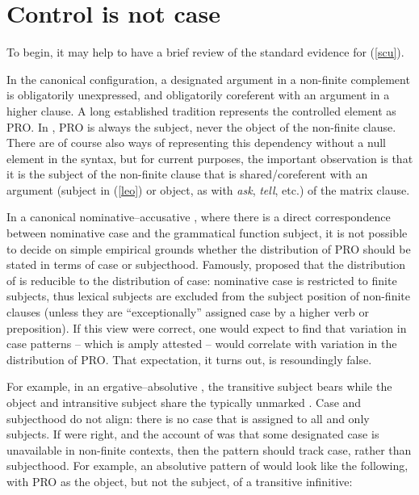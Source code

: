 \documentclass[output=paper]{langsci/langscibook}
\begin{document}
\section{Control is not case}

To begin, it may help to have a brief review of the standard evidence for
(\ref{scu}).

In the canonical  configuration, a designated argument in a non-finite
complement is obligatorily unexpressed, and obligatorily coreferent with an
argument in a higher clause. A long established tradition represents the
controlled element as PRO. In , PRO is always the subject, never the
object of the non-finite clause. There are of course also ways of representing
this dependency without a null element in the syntax, but for current purposes,
the important observation is that it is the subject of the non-finite clause
that is shared/coreferent with an argument (subject in (\ref{leo}) or object,
as with \emph{ask}, \emph{tell}, etc.) of the matrix clause.

\ea \label{leo}	\begin{xlista}
	\end{xlista}
\z

In a canonical nominative--accusative , where there is a direct
correspondence between nominative case and the grammatical function subject, it
is not possible to decide on simple empirical grounds whether the distribution
of PRO should be stated in terms of case or subjecthood. Famously,
\cite{Vergnaud1977,Chomsky1980} proposed that the distribution of  is
reducible to the distribution of case:  nominative case is restricted to
finite subjects, thus lexical subjects are excluded from the subject position
of non-finite clauses (unless they are \enquote{exceptionally} assigned case by
a higher verb or preposition).  If this view were correct, one would expect to
find that variation in case patterns -- which is amply attested -- would
correlate with variation in the distribution of PRO. That expectation, it turns
out, is resoundingly false.

For example, in an ergative--absolutive , the transitive subject
bears  while the object and intransitive subject share the
typically unmarked . Case and subjecthood do not align:
there is no case that is assigned to all and only subjects. If
\citeauthor{Vergnaud1977} were right, and the account of  was that
some designated case is unavailable in non-finite contexts, then the
 pattern should track case, rather than subjecthood.  For example,
an absolutive pattern of  would look like
the following, with PRO as the object, but not the subject, of a transitive
infinitive:
\end{document}
